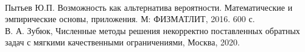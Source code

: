 \documentclass[12pt, a4paper, oneside]{article}
\begin{document}
	~\\
	
	~\\
	
	~\\
	
	~\\
	
	~\\
	
	~\\
			
	\small
	\begin{thebibliography}{22}\addtolength{\itemsep}{-4.5ex}
		  Пытьев Ю.П. Возможность как альтернатива вероятности. Математические и эмпирические основы, приложения. М: ФИЗМАТЛИТ, 2016. 600 с.\\
		  В. А. Зубюк, Численные методы решения некорректно поставленных обратных задач с мягкими качественными ограничениями, Москва, 2020.\\
	\end{thebibliography}
\end{document}
